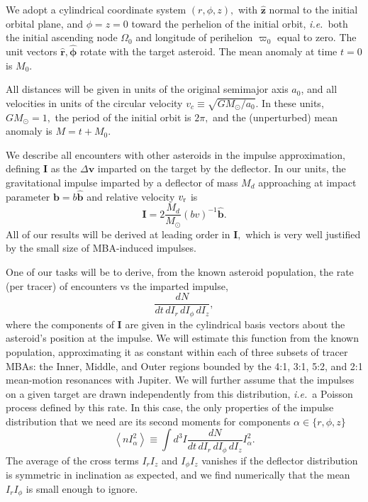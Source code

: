 \documentclass[linenumbers, onecolumn]{aastex631}
\newcommand{\ie}{\textit{i.e.\/}}
\newcommand{\vecI}{\mathbf{I}}
\newcommand{\vecb}{\mathbf{b}}
\newcommand{\bhat}{\mathbf{\hat b}}
\newcommand{\rhat}{\mathbf{\hat r}}
\newcommand{\phat}{\boldsymbol{\hat\phi}}
\newcommand{\zhat}{\mathbf{\hat z}}
\newcommand{\vecv}{\mathbf{v}}
\newcommand{\vcirc}{v_c}
\newcommand{\vrel}{v_{\rm r}}
\newcommand{\Msun}{M_\odot}
\newcommand{\lop}{\varpi}
\begin{document}
We adopt a cylindrical coordinate system $(r,\phi,z),$ with $\zhat$
normal to the initial orbital plane, and $\phi=z=0$ toward the
perhelion of the initial orbit, \ie\ both the initial ascending node
$\Omega_0$ and longitude of perihelion $\lop_0$ equal to zero.  The
unit vectors $\rhat, \phat$ rotate with the target asteroid.  The mean
anomaly at time $t=0$ is $M_0.$

All distances will be given in units of the original semimajor axis $a_0$, and all velocities in units of the circular velocity $\vcirc \equiv \sqrt{G\Msun/a_0}.$  In these units, $G\Msun=1,$ the period of the initial orbit is $2\pi,$ and the (unperturbed) mean anomaly is $M=t+M_0.$ 

We describe all encounters with other asteroids in the impulse approximation, defining $\vecI$ as the $\Delta\vecv$ imparted on the target by the deflector.
In our units, the gravitational impulse imparted by a deflector of mass $M_d$ approaching at impact parameter $\vecb=b\bhat$ and relative velocity $\vrel$ is
\begin{equation}
  \vecI = 2 \frac{M_d}{\Msun} (bv)^{-1} \bhat.
  \label{eq:impulse}
\end{equation}
All of our results will be derived at leading order in $\vecI,$ which
is very well justified by the small size of MBA-induced impulses.

One of our tasks will be to derive, from the known asteroid population, the rate (per tracer) of encounters vs the imparted impulse,
\begin{equation}
  \frac{dN}{dt\,dI_r\,dI_\phi\,dI_z},
  \label{eq:dN}
\end{equation}
where the components of $\vecI$ are given in the cylindrical basis
vectors about the asteroid's position at the impulse.
We will estimate this function from the known population,
approximating it as constant within each of three subsets of tracer MBAs:
the Inner, Middle, and Outer regions bounded by the 4:1, 3:1,
5:2, and 2:1 mean-motion resonances with Jupiter.
We will further assume that the impulses on a given target are drawn
independently from this distribution, \ie\ a Poisson process defined
by this rate.  In this case, the only properties of the impulse
distribution that we need are its second moments for components $\alpha \in \{r,\phi,z\}$
\begin{equation}
  \left \langle n I_\alpha^2 \right\rangle \equiv \int d^3I \frac{dN}{dt\,dI_r\,dI_\phi\,dI_z} I_\alpha^2.
\label{eq:nvsq}
\end{equation}
The average of the cross terms $I_rI_z$ and $I_\phi I_z$ vanishes if
the deflector distribution is symmetric in inclination as expected, and we find numerically that the mean $I_rI_\phi$ is small enough to ignore.
\end{document}
